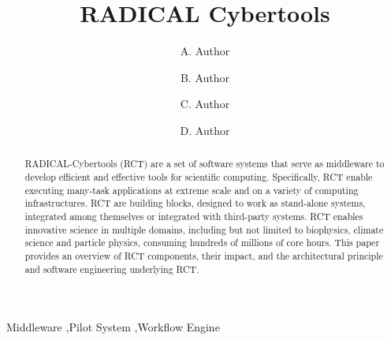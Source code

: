 \documentclass[preprint,12pt, a4paper]{elsarticle}
\begin{document}
\begin{frontmatter}

\title{RADICAL Cybertools}

\author{A. Author}
\address{Your institute, some address}

\author{B. Author}
\address{Your institute, some address}

\author{C. Author}
\address{Your institute, some address}

\author{D. Author}
\address{Your institute, some address}




\begin{abstract}

RADICAL-Cybertools (RCT) are a set of software systems that serve as
middleware to develop efficient and effective tools for scientific computing.
Specifically, RCT enable executing many-task applications at extreme scale and
on a variety of computing infrastructures. RCT are building blocks, designed
to work as stand-alone systems, integrated among themselves or integrated with
third-party systems. RCT enables innovative science in multiple domains,
including but not limited to biophysics, climate science and particle physics,
consuming hundreds of millions of core hours. This paper provides an overview
of RCT components, their impact, and the architectural principle and software
engineering underlying RCT.
\end{abstract}

\begin{keyword}
Middleware \sep Pilot System \sep Workflow Engine



\end{keyword}

\end{frontmatter}

\linenumbers{}
\end{document}
